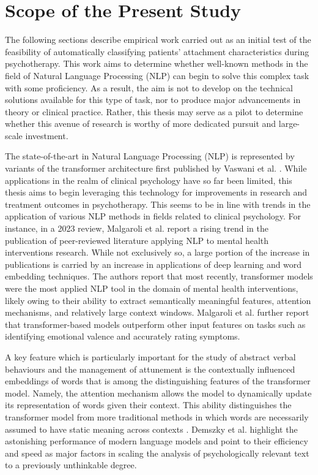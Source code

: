 \documentclass[12pt]{report}
\begin{document}
\section{Scope of the Present Study}
The following sections describe empirical work carried out as an initial test of the feasibility of automatically classifying patients' attachment characteristics during psychotherapy.
This work aims to determine whether well-known methods in the field of Natural Language Processing (NLP) can begin to solve this complex task with some proficiency.
As a result, the aim is not to develop on the technical solutions available for this type of task, nor to produce major advancements in theory or clinical practice.
Rather, this thesis may serve as a pilot to determine whether this avenue of research is worthy of more dedicated pursuit and large-scale investment.

The state-of-the-art in Natural Language Processing (NLP) is represented by variants of the transformer architecture first published by Vaswani et al. \citeyear{Vaswani2017}.
While applications in the realm of clinical psychology have so far been limited, this thesis aims to begin leveraging this technology for improvements in research and treatment outcomes in psychotherapy.
This seems to be in line with trends in the application of various NLP methods in fields related to clinical psychology.
For instance, in a 2023 review, Malgaroli et al. \citeyear{Malgaroli2023} report a rising trend in the publication of peer-reviewed literature applying NLP to mental health interventions research.
While not exclusively so, a large portion of the increase in publications is carried by an increase in applications of deep learning and word embedding techniques.
The authors report that most recently, transformer models were the most applied NLP tool in the domain of mental health interventions, likely owing to their ability to extract semantically meaningful features, attention mechanisms, and relatively large context windows.
Malgaroli et al. \citeyear{Malgaroli2023} further report that transformer-based models outperform other input features on tasks such as identifying emotional valence and accurately rating symptoms.

A key feature which is particularly important for the study of abstract verbal behaviours and the management of attunement is the contextually influenced embeddings of words that is among the distinguishing features of the transformer model.
Namely, the attention mechanism allows the model to dynamically update its representation of words given their context.
This ability distinguishes the transformer model from more traditional methods in which words are necessarily assumed to have static meaning across contexts \cite{Demszky2023}.
Demszky et al. \citeyear{Demszky2023} highlight the astonishing performance of modern language models and point to their efficiency and speed as major factors in scaling the analysis of psychologically relevant text to a previously unthinkable degree.
\end{document}
